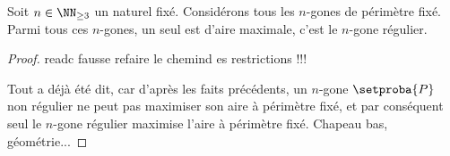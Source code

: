

\begin{fact}
	Soit $n \in \NN_{\geq3}$ un naturel fixé.
	Considérons tous les $n$-gones de périmètre fixé. Parmi tous ces $n$-gones, un seul est d'aire maximale, c'est le $n$-gone régulier.
\end{fact}


\begin{proof}
	readc fausse
	refaire le chemind es restrictions !!!
	
	Tout a déjà été dit, car d'après les faits précédents, un $n$-gone $\setproba{P}$ non régulier ne peut pas maximiser son aire à périmètre fixé, et par conséquent seul le $n$-gone régulier maximise l'aire à périmètre fixé. Chapeau bas, géométrie...
\end{proof}
